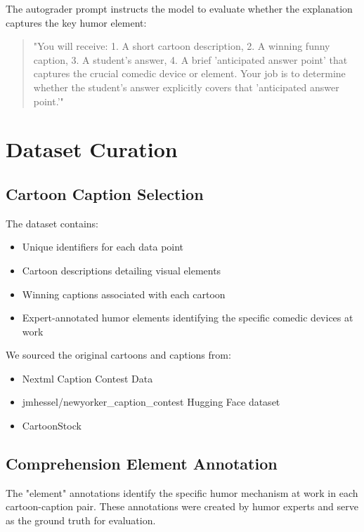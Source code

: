 \documentclass[twocolumn]{article}
\begin{document}
The autograder prompt instructs the model to evaluate whether the explanation captures the key humor element:
\begin{quote}
"You will receive: 1. A short cartoon description, 2. A winning funny caption, 3. A student's answer, 4. A brief 'anticipated answer point' that captures the crucial comedic device or element. Your job is to determine whether the student's answer explicitly covers that 'anticipated answer point.'"
\end{quote}


\section{Dataset Curation}

\subsection{Cartoon Caption Selection}

The dataset contains:
\begin{itemize}
    \item Unique identifiers for each data point
    \item Cartoon descriptions detailing visual elements
    \item Winning captions associated with each cartoon
    \item Expert-annotated humor elements identifying the specific comedic devices at work
\end{itemize}

We sourced the original cartoons and captions from:
\begin{itemize}
    \item Nextml Caption Contest Data
    \item jmhessel/newyorker\_caption\_contest Hugging Face dataset
    \item CartoonStock
\end{itemize}


\subsection{Comprehension Element Annotation}

The "element" annotations identify the specific humor mechanism at work in each cartoon-caption pair. These annotations were created by humor experts and serve as the ground truth for evaluation.
\end{document}
